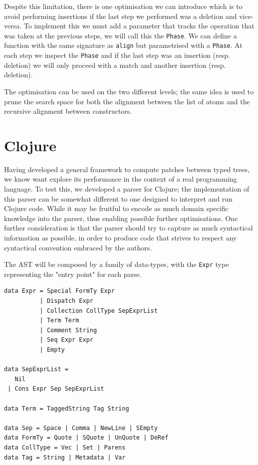 \documentclass[11pt, titlepage]{article}
\newcommand{\toHaskell}[1]{\texttt{#1}\xspace}
\begin{document}
Despite this limitation, there is one optimisation we can introduce which is to 
avoid performing insertions if the last step we performed was a deletion and
vice-versa.
To implement this we must add a parameter that tracks the operation that
was taken at the previous steps, we will call this the \texttt{Phase}. We
can define a function with the same signature as \texttt{align} but parametrised with a \texttt{Phase}. At each step we inspect the \texttt{Phase} and if the last step was an insertion (resp. deletion) we will only proceed with a match and another insertion (resp. deletion). 

The optimisation can be used on the two different levels; the same idea is used to prune the search space for both the alignment between the list of atoms and the recursive alignment between constructors. 


\section{Clojure}
Having developed a general framework to compute patches between typed trees, we know want explore its performance in the context of a real programming language.
To test this, we developed a parser for Clojure; the implementation of this parser can be somewhat different to one designed to interpret and run Clojure code. While it may be fruitful to encode as much domain specific knowledge into the parser, thus enabling possible further optimisations. 
One further consideration is that the parser should try to capture as much syntactical information as possible, in order to produce code that strives to respect any syntactical convention embraced by the authors.

The AST will be composed by a family of data-types, with the \toHaskell{Expr} type representing the "entry point" for each parse. 

\begin{verbatim}
data Expr = Special FormTy Expr
          | Dispatch Expr
          | Collection CollType SepExprList
          | Term Term 
          | Comment String
          | Seq Expr Expr
          | Empty
          
data SepExprList =
   Nil
 | Cons Expr Sep SepExprList
 
data Term = TaggedString Tag String

data Sep = Space | Comma | NewLine | SEmpty
data FormTy = Quote | SQuote | UnQuote | DeRef
data CollType = Vec | Set | Parens
data Tag = String | Metadata | Var
\end{verbatim}
\end{document}
